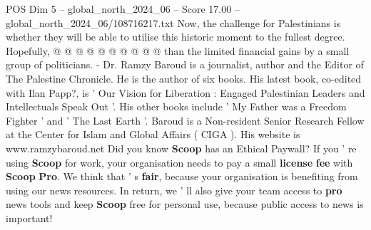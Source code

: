 \begin{textsample}{POS Dim 5 – global\_north\_2024\_06 – Score 17.00 – global\_north\_2024\_06/108716217.txt}
Now, the challenge for Palestinians is whether they will be able to utilise this historic moment to the fullest degree.
Hopefully, @ @ @ @ @ @ @ @ @ @ than the limited financial gains by a small group of politicians. - Dr.
Ramzy Baroud is a journalist, author and the Editor of The Palestine Chronicle.
He is the author of six books.
His latest book, co-edited with Ilan Papp?, is ' Our Vision for Liberation : Engaged Palestinian Leaders and Intellectuals Speak Out '.
His other books include ' My Father was a Freedom Fighter ' and ' The Last Earth '.
Baroud is a Non-resident Senior Research Fellow at the Center for Islam and Global Affairs ( CIGA ).
His website is www.ramzybaroud.net Did you know \textbf{Scoop} has an Ethical Paywall?
If you ' re using \textbf{Scoop} for work, your organisation needs to pay a small \textbf{license} \textbf{fee} with \textbf{Scoop} \textbf{Pro}.
We think that ' s \textbf{fair}, because your organisation is benefiting from using our news resources.
In return, we ' ll also give your team access to \textbf{pro} news tools and keep \textbf{Scoop} free for personal use, because public access to news is important!

\end{textsample}
